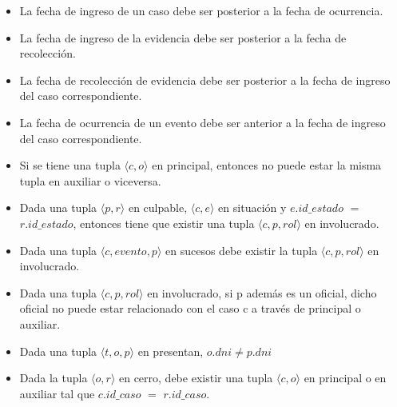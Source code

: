 \begin{itemize}
\item La fecha de ingreso de un caso debe ser posterior a la fecha de ocurrencia.

\item La fecha de ingreso de la evidencia debe ser posterior a la fecha de recolección.

\item La fecha de recolección de evidencia debe ser posterior a la fecha de ingreso del caso correspondiente.

\item La fecha de ocurrencia de un evento debe ser anterior a la fecha de ingreso del caso correspondiente.

\item Si se tiene una tupla $\langle c,o\rangle$ en principal, entonces no puede estar la misma tupla en auxiliar o viceversa.

\item Dada una tupla $\langle p,r \rangle$ en culpable, $\langle c,e \rangle$ en situación y $e.id\_estado$ $=$ $r.id\_estado$, entonces tiene que existir una tupla $\langle c,p,rol \rangle$ en involucrado.

\item Dada una tupla $\langle c,evento,p \rangle$ en sucesos debe existir la tupla $\langle c,p,rol \rangle$ en involucrado.

\item Dada una tupla $\langle c,p,rol \rangle$ en involucrado, si p además es un oficial, dicho oficial no puede estar relacionado con el caso c a través de principal o auxiliar.

\item Dada una tupla $\langle t,o,p \rangle$ en presentan, $o.dni \neq p.dni$

\item Dada la tupla $\langle o,r \rangle$ en cerro, debe existir una tupla $\langle c,o \rangle$ en principal o en auxiliar tal que $c.id\_caso$ $=$ $r.id\_caso$.
\end{itemize}
